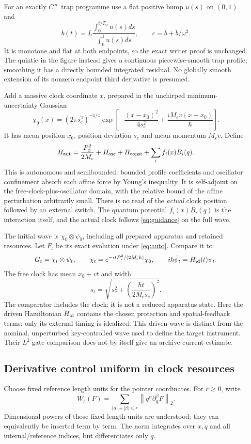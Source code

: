 \documentclass[11pt]{article}
\theoremstyle{definition}\newtheorem{assumption}[theorem]{Constitutive assumption}
\theoremstyle{remark}\newtheorem{remark}[theorem]{Remark}
\newcommand{\norm}[1]{\left\|#1\right\|}\newcommand{\pos}[1]{[#1]_+}
\begin{document}
For an exactly $C^\infty$ trap programme use a flat positive bump $u(s)$ on $(0,1)$ and
\[
 b(t)=L\frac{\int_0^{t/T_w}u(s)ds}{\int_0^1u(s)ds},\qquad
 c=b+\ddot b/\omega^2.
\]
It is monotone and flat at both endpoints, so the exact writer proof is unchanged. The quintic in the figure instead gives a continuous piecewise-smooth trap profile; smoothing it has a directly bounded integrated residual. No globally smooth extension of its nonzero endpoint third derivative is presumed.

Add a massive clock coordinate $x$, prepared in the unchirped minimum-uncertainty Gaussian
\[
 \chi_0(x)=(2\pi s_c^2)^{-1/4}\exp\left[-\frac{(x-x_0)^2}{4s_c^2}+\frac{iM_cv(x-x_0)}{\hbar}\right].
\]
It has mean position $x_0$, position deviation $s_c$ and mean momentum $M_cv$. Define
\begin{equation}\label{eq:auto}
 H_{\rm aut}=\frac{P_x^2}{2M_c}+H_{\rm osc}+H_{\rm const}+
                              \sum_i f_i(x)B_i(q).
\end{equation}
This is autonomous and semibounded: bounded profile coefficients and oscillator confinement absorb each affine force by Young's inequality. It is self-adjoint on the free-clock-plus-oscillator domain, with the relative bound of the affine perturbation arbitrarily small. There is no read of the \emph{actual} clock position followed by an external switch. The quantum potential $f_i(x)B_i(q)$ is the interaction itself, and the actual clock follows \eqref{eq:guidance} on the full wave.

The initial wave is $\chi_0\otimes\psi_0$, including all prepared apparatus and retained resources. Let $F_t$ be its exact evolution under \eqref{eq:auto}. Compare it to
\[
 G_t=\chi_t\otimes\psi_t,\qquad
 \chi_t=e^{-itP_x^2/(2M_c\hbar)}\chi_0,\qquad
 i\hbar\dot\psi_t=H_{\rm id}(t)\psi_t.
\]
The free clock has mean $x_0+vt$ and width
\begin{equation}\label{eq:clockwidth}
 s_t=\sqrt{s_c^2+\left(\frac{\hbar t}{2M_cs_c}\right)^2}.
\end{equation}
The comparator includes the clock; it is not a reduced apparatus state. Here the driven Hamiltonian $H_{\rm id}$ contains the chosen protection and spatial-feedback terms: only its external timing is idealized. This driven wave is distinct from the nominal, unperturbed key-controlled wave used to define the target instrument. Their $L^2$ gate comparison does not by itself give an archive-current estimate.

\subsection{Derivative control uniform in clock resources}
Choose fixed reference length units for the pointer coordinates. For $r\ge0$, write
\[
 W_r(F)=\sum_{|\alpha|+|\beta|\le r}\norm{q^\alpha\partial_q^\beta F}_2.
\]
Dimensional powers of those fixed length units are understood; they can equivalently be inserted term by term. The norm integrates over $x,q$ and all internal/reference indices, but differentiates only $q$.
\end{document}
